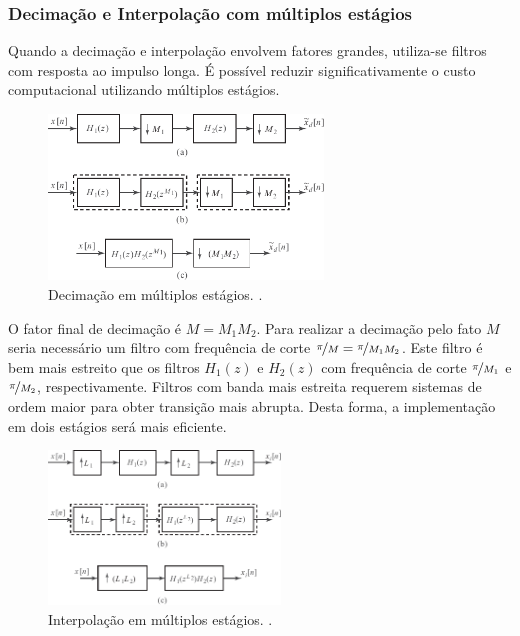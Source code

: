 \begin{frame}[allowframebreaks]
  \frametitle{Decimação e Interpolação com múltiplos estágios}
  Quando a decimação e interpolação envolvem fatores grandes, utiliza-se filtros com resposta ao 
  impulso longa. É possível reduzir significativamente o custo computacional utilizando 
  múltiplos estágios.

  \framebreak 

        \begin{figure}[h!]
        \centering
        \includegraphics[width=0.65\textwidth]{images/fig433.pdf}
        \caption{Decimação em múltiplos estágios. \citep{oppenheim2009}.}
        \label{fig:fig433}
        \end{figure}

  O fator final de decimação é $M = M_1 M_2$. Para realizar a decimação pelo fato $M$
  seria necessário um filtro com frequência de corte $\nicefrac{\pi}{M} = \nicefrac{\pi}{M_1 M_2}$.
  Este filtro é bem mais estreito que os filtros $H_1(z)$ e $H_2(z)$ com frequência de corte
  $\nicefrac{\pi}{M_1}$ e $\nicefrac{\pi}{M_2}$, respectivamente. Filtros com banda mais estreita 
  requerem sistemas de ordem maior para obter transição mais abrupta. Desta forma, a implementação
  em dois estágios será mais eficiente.


        \begin{figure}[h!]
        \centering
        \includegraphics[width=0.55\textwidth]{images/fig434.pdf}
        \caption{Interpolação em múltiplos estágios. \citep{oppenheim2009}.}
        \label{fig:fig434}
        \end{figure}

\end{frame}


